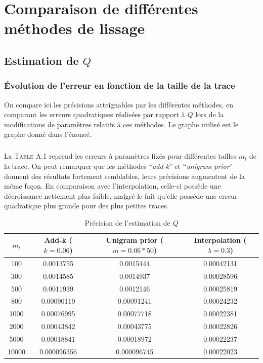 \documentclass[a4paper,titlepage]{report}
\begin{document}
\appendix

\chapter{Comparaison de différentes méthodes de lissage}


\section{Estimation de $Q$}
	\subsection{Évolution de l'erreur en fonction de la taille de la trace}

On compare ici les précisions atteignables par les différentes méthodes, en comparant les erreurs quadratiques réalisées par rapport à $Q$ lors de la modifications de paramètres relatifs à ces méthodes. Le graphe utilisé est le graphe donné dans l'énoncé.

\paragraph{}
La \textsc{Table A.1} reprend les erreurs à paramètres fixés pour différentes tailles $m_t$ de la trace. On peut remarquer que les méthodes ``\textit{add-k}'' et ``\textit{unigram prior}'' donnent des résultats fortement semblables, leurs précisions augmentent de la même façon. En comparaison avec l'interpolation, celle-ci possède une décroissance nettement plus faible, malgré le fait qu'elle possède une erreur quadratique plus grande pour des plus petites traces. 
\begin{table}[h]
	\center
	\begin{tabular}{c|ccc}
	$m_t$ & Add-k ($k = 0.06$) & Unigram prior ($m = 0.06 * 50$) & Interpolation ($\lambda = 0.3$)\\
	\hline
	100 & \num{0.0013755} & \num{0.0015444} & \num{0.00042131}\\
	300 & \num{0.0014585} & \num{0.0014937} & \num{0.00028596}\\
	500 & \num{0.0011939} & \num{0.0012146} & \num{0.00025819}\\
	800 & \num{0.00090119} & \num{0.00091241} & \num{0.00024232}\\
	1000 & \num{0.00076995} & \num{0.00077718} & \num{0.00022381}\\
	2000 & \num{0.00043842} & \num{0.00043775} & \num{0.00022826}\\
	5000 & \num{0.00018841} & \num{0.00018972} & \num{0.00022237}\\	
	10000 & \num{0.000096356} & \num{0.000096745} & \num{0.00022023}\\	
	\end{tabular}
	\caption{Précision de l'estimation de $Q$}
	\label{tab:}
\end{table}
\end{document}
